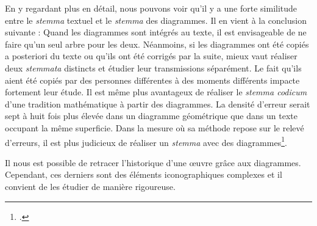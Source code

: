 En y regardant plus en détail, nous pouvons voir qu'il y a une forte similitude entre le \textit{stemma} textuel et le \textit{stemma} des diagrammes.
Il en vient à la conclusion suivante : Quand les diagrammes sont intégrés au texte, il est envisageable de ne faire qu'un seul arbre pour les deux.
Néanmoins, si les diagrammes ont été copiés a posteriori du texte ou qu'ils ont été corrigés par la suite, mieux vaut réaliser deux \textit{stemmata} distincts et étudier leur transmissions séparément.
Le fait qu'ils aient été copiés par des personnes différentes à des moments différents impacte fortement leur étude.
Il est même plus avantageux de réaliser le \textit{stemma codicum} d'une tradition mathématique à partir des diagrammes.
La densité d'erreur serait sept à huit fois plus élevée dans un diagramme géométrique que dans un texte occupant la même superficie.
Dans la mesure où sa méthode repose sur le relevé d'erreurs, il est plus judicieux de réaliser un \textit{stemma} avec des diagrammes\footcite{raynaudBuildingStemmaCodicum2014}.

Il nous est possible de retracer l'historique d'une œuvre grâce aux diagrammes.
Cependant, ces derniers sont des éléments iconographiques complexes et il convient de les étudier de manière rigoureuse.